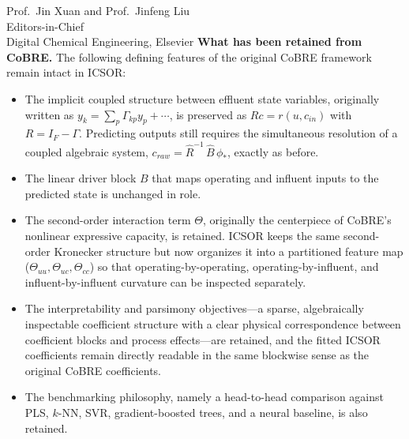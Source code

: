 \documentclass[11pt,a4paper]{letter}
\begin{document}
\begin{letter}{Prof.\ Jin Xuan and Prof.\ Jinfeng Liu \\ Editors-in-Chief \\ Digital Chemical Engineering, Elsevier}
\textbf{What has been retained from CoBRE.} The following defining features of the original CoBRE framework remain intact in ICSOR:
\begin{itemize}
    \item The implicit coupled structure between effluent state variables, originally written as $y_k = \sum_p \Gamma_{kp} y_p + \cdots$, is preserved as $Rc = r(u, c_{in})$ with $R = I_F - \Gamma$. Predicting outputs still requires the simultaneous resolution of a coupled algebraic system, $c_{raw} = \widehat{R}^{-1}\,\widehat{B}\,\phi_*$, exactly as before.
    \item The linear driver block $B$ that maps operating and influent inputs to the predicted state is unchanged in role.
    \item The second-order interaction term $\Theta$, originally the centerpiece of CoBRE's nonlinear expressive capacity, is retained. ICSOR keeps the same second-order Kronecker structure but now organizes it into a partitioned feature map ($\Theta_{uu}, \Theta_{uc}, \Theta_{cc}$) so that operating-by-operating, operating-by-influent, and influent-by-influent curvature can be inspected separately.
    \item The interpretability and parsimony objectives---a sparse, algebraically inspectable coefficient structure with a clear physical correspondence between coefficient blocks and process effects---are retained, and the fitted ICSOR coefficients remain directly readable in the same blockwise sense as the original CoBRE coefficients.
    \item The benchmarking philosophy, namely a head-to-head comparison against PLS, $k$-NN, SVR, gradient-boosted trees, and a neural baseline, is also retained.
\end{itemize}


\end{letter}
\end{document}
